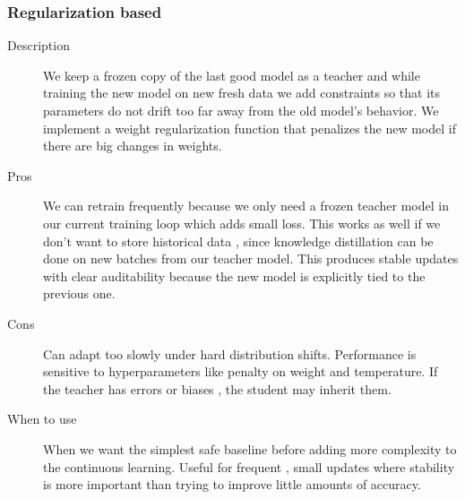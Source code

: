 \subsubsection*{Regularization based}
\begin{description}
  \item[Description] We keep a frozen copy of the last good model as a teacher and while training the new model on new fresh data we add constraints so that its parameters do not drift too far away from the old model’s behavior. We implement a weight regularization function that penalizes the new model if there are big changes in weights.
  \item[Pros] We can retrain frequently because we only need a frozen teacher model in our current training loop which adds small loss. This works as well if we don't want to store historical data , since knowledge distillation can be done on new batches from our teacher model. This produces stable updates with clear auditability because the new model is explicitly tied to the previous one.
  \item[Cons] Can adapt too slowly under hard distribution shifts. Performance is sensitive to hyperparameters like penalty on weight and temperature. If the teacher has errors or biases , the student may inherit them.
  \item[When to use] When we want the simplest safe baseline before adding more complexity to the continuous learning. Useful for frequent , small updates where stability is more important than trying to improve little amounts of accuracy.
\end{description}

